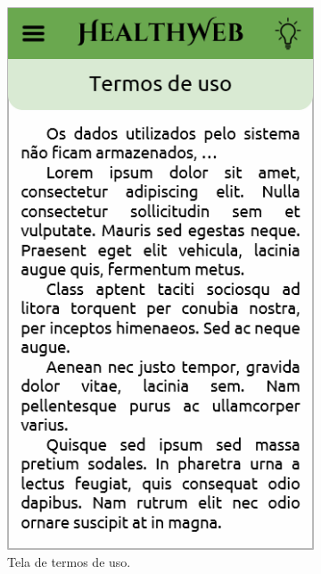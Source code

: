 \begin{figure}[htbp]
\begin{subfigure}{0.24\linewidth}
		\includegraphics[width=\linewidth]{figure/prototype/mobile/terms.png}
		\caption{Tela de termos de uso.}
		\label{fig:mobile:terms}
	\end{subfigure}
	\hfill
	\begin{subfigure}{0.24\linewidth}
		\centering

\end{subfigure}
\end{figure}
